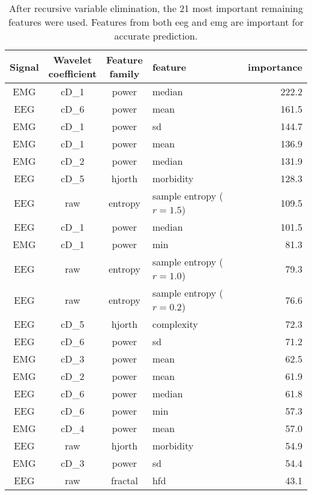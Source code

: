 \begin {table}[!h]
\begin{center}
\caption{
After recursive variable elimination, the 21 most important remaining features were used.
Features from both \gls{eeg} and \gls{emg} are important for accurate prediction.
\label{tab:importances}}

\small
\begin{tabular}{|c|c|c|l|r|}
  \hline
 Signal & \specialcell{Wavelet\\coefficient} & \specialcell{Feature\\family}  & feature & importance\\
\hline
\hline
EMG & cD\_1 & power & median & 222.2\\
EEG & cD\_6 & power & mean & 161.5\\
EMG & cD\_1 & power & sd &  144.7\\
EMG & cD\_1 & power & mean & 136.9\\
EMG & cD\_2 & power & median & 131.9\\
EEG & cD\_5 & hjorth & morbidity & 128.3\\
EEG & raw & entropy & sample entropy ($r=1.5$) & 109.5\\
EEG & cD\_1 & power & median & 101.5\\
EMG & cD\_1 & power & min & 81.3\\
EEG & raw & entropy & sample entropy ($r=1.0$) & 79.3\\
EEG & raw & entropy & sample entropy ($r=0.2$) & 76.6\\
EEG & cD\_5 & hjorth & complexity & 72.3\\
EEG & cD\_6 & power & sd & 71.2\\
EMG & cD\_3 & power & mean & 62.5\\
EMG & cD\_2 & power & mean & 61.9\\
EEG & cD\_6 & power & median & 61.8\\
EEG & cD\_6 & power & min & 57.3\\
EMG & cD\_4 & power & mean & 57.0\\
EEG & raw & hjorth & morbidity & 54.9\\
EMG & cD\_3 & power & sd & 54.4\\
EEG & raw & fractal & hfd & 43.1\\
\hline
 


\end{tabular}
\end{center}
\end{table}

